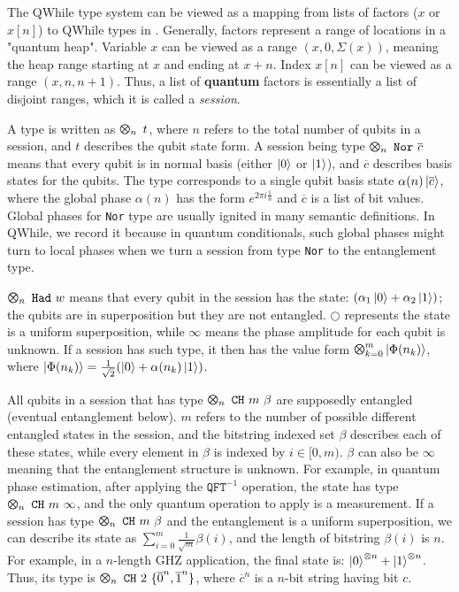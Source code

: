 The QWhile type system can be viewed as a mapping from lists of factors ($x$ or $x[n]$) to QWhile types in .
Generally, factors represent a range of locations in a "quantum heap".
Variable $x$ can be viewed as a range $(x,0,\Sigma(x))$, meaning the heap range starting at $x$ and ending at $x+n$.
Index $x[n]$ can be viewed as a range $(x,n,n+1)$.
Thus, a list of \textbf{quantum} factors is essentially a list of disjoint ranges, which it is called a \textit{session}.

A type is written as $\ttype{n}{t}$, where $n$ refers to the total number of qubits in a session,
and $t$ describes the qubit state form. 
A session being type $\ttype{n}{\tnor{\overline{c}}}$
means that every qubit is in normal basis (either $\left\vert{0}\right\rangle$ or $\left\vert{1}\right\rangle$),
and $\overline{c}$ describes basis states for the qubits.
The type corresponds to a single qubit basis state $\alpha(n)\left\vert{\overline{c}}\right\rangle$,
where the global phase $\alpha(n)$ has the form $e^{2 \pi i \frac{1}{n}}$ and $\overline{c}$ is a list of bit values.
Global phases for \texttt{Nor} type are usually ignited in many semantic definitions.
In QWhile, we record it because in quantum conditionals, such global phases might turn to local phases
when we turn a session from type \texttt{Nor} to the entanglement type.

$\ttype{n}{\thad{w}}$ means that every qubit in the session has the state: $(\alpha_1\left\vert{0}\right\rangle + \alpha_2\left\vert{1}\right\rangle)$;
the qubits are in superposition but they are not entangled.
$\bigcirc$ represents the state is a uniform superposition,
while $\infty$ means the phase amplitude for each qubit is unknown.
If a session has such type, it then has the value form $\Motimes_{k=0}^{m}\ket{\Phi(n_k)}$,
where $\left\vert{\Phi(n_k)}\right\rangle=\frac{1}{\sqrt{2}}(\left\vert{0}\right\rangle+\alpha(n_k)\left\vert{1}\right\rangle)$.

All qubits in a session that has type $\ttype{n}{\tch{m}{\beta}}$ are supposedly entangled (eventual entanglement below).
$m$ refers to the number of possible different entangled states in the session,
and the bitstring indexed set $\beta$ describes each of these states, while every element in $\beta$ is indexed by $i\in [0,m)$.
$\beta$ can also be $\infty$ meaning that the entanglement structure is unknown.
For example, in quantum phase estimation, after applying the $\texttt{QFT}^{-1}$ operation, the state has type $\ttype{n}{\tch{m}{\infty}}$, and the only quantum operation to apply is a measurement.
If a session has type $\ttype{n}{\tch{m}{\beta}}$ and the entanglement is a uniform superposition,
we can describe its state as $\sum_{i=0}^{m}{\frac{1}{\sqrt{m}}\beta(i)}$, and the length of bitstring $\beta(i)$ is $n$.
For example, in a $n$-length GHZ application, the final state is: $\left\vert{0}\right\rangle^{\otimes n}+\left\vert{1}\right\rangle^{\otimes n}$. 
Thus, its type is $\ttype{n}{\tch{2}{\{\overline{0}^n,\overline{1}^n\}}}$, where $\overline{c}^n$ is a $n$-bit string having bit $c$.

